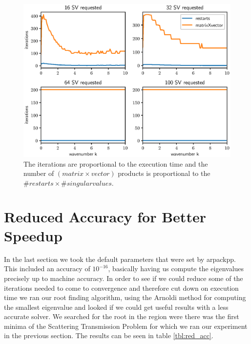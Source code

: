 \documentclass[a4paper, oneside]{discothesis}
\begin{document}
\begin{figure} [H]
	\centering
	\includegraphics[width=0.9\columnwidth]{figures/arnoldi_iter_1e-16_2.eps}
	\caption{
		The iterations are proportional to the execution time and the number of $(matrix\times vector)$ products is proportional to the $\#restarts \times \#singularvalues$.
	}
	\label{fig:arnoldi_iter_1e-16_2}
\end{figure}

\section{Reduced Accuracy for Better Speedup}
In the last section we took the default parameters that were set by arpackpp.
This included an accuracy of $10^{-16}$, basically having us compute the eigenvalues precisely up to machine accuracy.
In order to see if we could reduce some of the iterations needed to come to convergence and therefore cut down on execution time we ran our root finding algorithm, using the Arnoldi method for computing the smallest eigenvalue and looked if we could get useful results with a less accurate solver. 
We searched for the root in the region were there was the first minima of the Scattering Transmission Problem for which we ran our experiment in the previous section.
The results can be seen in table \ref{tbl:red_acc}.
\begin{table}[h!]
	\centering
	\caption{Change in singular values against change in grid size.}
	\label{tbl:red_acc}
\end{table}
\end{document}
